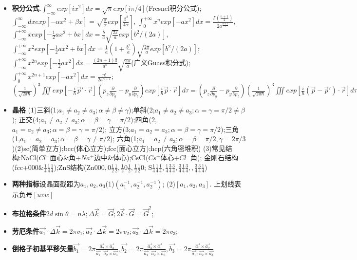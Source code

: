 \documentclass[UTF8,a4paper,3pt,twocolumn]{ctexart}
\begin{document}
\begin{itemize}
  \item \textbf{积分公式}.$\int_{-\infty}^{\infty}exp[ix^2]dx=\sqrt{\pi}exp[i\pi/4]$(Fresnel积分公式);
  $\int_{-\infty}^{\infty}dxexp[-\alpha x^2+\beta x]=\sqrt{\frac{\pi}{\alpha}}exp[\frac{\beta^2}{4\alpha}]$,
  $\int_{0}^{+\infty}x^{n}exp[-ax^{2}]dx=\frac{\Gamma(\frac{n+1}{2})}{2a^{\frac{n+1}{2}}}$,
  $\int_{-\infty}^{+\infty}xexp[-\frac{1}{2}ax^2+bx]dx=\frac{b}{a}\sqrt{\frac{2\pi}{a}}exp[b^2/(2a)]$,
  $\int_{-\infty}^{+\infty}x^{2}exp[-\frac{1}{2}ax^2+bx]dx=\frac{1}{a}(1+\frac{b^{2}}{a})\sqrt{\frac{2\pi}{a}}exp[b^{2}/(2a)]$;
  $\int_{-\infty}^{+\infty}x^{2n}exp[-\frac{1}{2}ax^{2}]dx=\frac{(2n-1)!!}{a^{n}}\sqrt{\frac{2\pi}{a}}$(广义Guass积分式);
  $\int_{0}^{+\infty}x^{2n+1}exp[-ax^{2}]dx=\frac{n!}{2a^{n+1}}$;
  $(\frac{1}{\sqrt{2\pi\hbar}})^{3}\iiint exp[-\frac{i}{\hbar}\vec{p}'\cdot\vec{r}](p_{z}\frac{\partial}{\partial p_{y}}-p_{y}\frac{\partial}{\partial p_{z}})exp[\frac{i}{\hbar}\vec{p}\cdot\vec{r}]d\tau=
  (p_{z}\frac{\partial}{\partial p_{y}}-p_{y}\frac{\partial}{\partial p_{z}})(\frac{1}{\sqrt{2\pi\hbar}})^{3}\iiint exp[\frac{i}{\hbar}(\vec{p}-\vec{p}')\cdot\vec{r}]d\tau
  =(p_{z}\frac{\partial}{\partial p_{y}}-p_{y}\frac{\partial}{\partial p_{z}})\delta(\vec{p}-\vec{p}')$

  \item \textbf{晶格}  (1)三斜(1;$a_1\neq a_2\neq a_3;\alpha\neq\beta\neq\gamma$);单斜(2;$a_1\neq a_2\neq a_3;\alpha=\gamma=\pi/2\neq\beta$);
  正交(4;$a_1\neq a_2\neq a_3;\alpha=\beta=\gamma=\pi/2$);四角(2,$a_1=a_2\neq a_3;\alpha=\beta=\gamma=\pi/2$);
  立方(3;$a_1=a_2=a_3;\alpha=\beta=\gamma=\pi/2$);三角(1,$a_1=a_2=a_3;\alpha=\beta=\gamma\neq\pi/2$);
  六角(1;$a_1=a_2\neq a_3;\alpha=\beta=\pi/2,\gamma=2\pi/3$)(2)sc(简单立方);bcc(体心立方);fcc(面心立方);hcp(六角密堆积)
  (3)常见结构:NaCl($Cl^{-}$面心\&角+$Na^{+}$边中\&体心);CsCl($Cs^{+}$体心+$Cl^{-}$角);
  金刚石结构(fcc+$000\&\frac{1}{4}\frac{1}{4}\frac{1}{4}$);ZnS结构(Zn$000,0\frac{1}{2}\frac{1}{2},\frac{1}{2}0\frac{1}{2},\frac{1}{2}\frac{1}{2}0$;
  S$\frac{1}{4}\frac{1}{4}\frac{1}{4},\frac{1}{4}\frac{3}{4}\frac{3}{4},\frac{3}{4}\frac{1}{4}\frac{3}{4},,\frac{3}{4}\frac{3}{4}\frac{1}{4}$)

  \item \textbf{两种指标}设晶面截距为$a_1,a_2,a_3$(1)$(a_1^{-1},a_{2}^{-1},a_2^{-1})$;
  (2)$[a_1,a_2,a_3]$.
  上划线表示负号$[u\overline{v}w]$
  
  \item \textbf{布拉格条件}$2d\sin{\theta}=n\lambda;\Delta\vec{k}=\vec{G};2\vec{k}\cdot\vec{G}=\vec{G}^2$;
  \item \textbf{劳厄条件}$\vec{a_1}\cdot\Delta\vec{k}=2\pi v_1;\vec{a_2}\cdot\Delta\vec{k}=2\pi v_2;\vec{a_3}\cdot\Delta\vec{k}=2\pi v_3$;
  \item \textbf{倒格子初基平移矢量}$\vec{b_1}=2\pi\frac{\vec{a_2}\times\vec{a_3}}{\vec{a_1}\cdot\vec{a_2}\times\vec{a_3}},
  \vec{b_2}=2\pi\frac{\vec{a_3}\times\vec{a_1}}{\vec{a_1}\cdot\vec{a_2}\times\vec{a_3}},
  \vec{b_3}=2\pi\frac{\vec{a_1}\times\vec{a_2}}{\vec{a_1}\cdot\vec{a_2}\times\vec{a_3}}$


\end{itemize}
\end{document}
